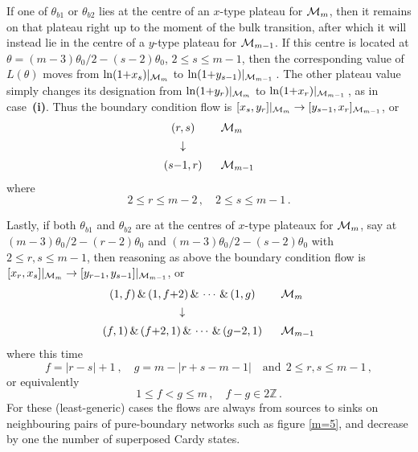 \documentclass[11pt]{article}
\newcommand\ZZ{{\mathbb Z}}
\newcommand{\CM}{{\cal M}}
\newcommand\beq{\begin{equation}}
\newcommand\eeq{\end{equation}}
\newcommand{\tbi}{\theta_{b1}}
\newcommand{\tbii}{\theta_{b2}}
\newcommand{\tz}{\theta_0}
\begin{document}
\smallskip

If one of $\tbi$ or $\tbii$ lies at the centre of an $x$-type plateau
for $\CM_m$, then it remains on that plateau right up to 
the moment of the bulk transition, after which it will instead lie in
the centre of a $y$-type plateau for $\CM_{m-1}$.
If this centre is located at $\theta=(m-3)\tz/2-(s{-}2)\tz$, 
$2\le s\le m{-}1$, then the corresponding
value of $L(\theta)$ moves from $\ln(1{+}x_s)|_{\CM_m}$ to
$\ln(1{+}y_{s-1})|_{\CM_{m-1}}$\,. 
The other plateau value simply changes its designation
from $\ln(1{+}y_r)|_{\CM_m}$ to
$\ln(1{+}x_r)|_{\CM_{m-1}}$\,, as in case~{\bf (i)}. 
Thus the boundary condition flow is
$[x_s,y_r]|_{\CM_m}\to [y_{s-1},x_r]_{\CM_{m-1}}$, or
\beq
\begin{array}{cl}
(r,s) & ~~\CM_m\\[4pt]
\downarrow & \\[5pt]
(s{-}1,r) & ~~\CM_{m-1}
\end{array}
\label{case2}
\eeq
where
\beq
2\le r\le m{-}2\,,\quad
2\le s\le m{-}1\,.
\eeq

\smallskip

Lastly, if both $\tbi$ and $\tbii$ are at the centres of $x$-type
plateaux for $\CM_m$, say at
$(m-3)\tz/2-(r{-}2)\tz$ and
$(m-3)\tz/2-(s{-}2)\tz$ with $2\le r,s\le m{-}1$, 
then reasoning as above the boundary condition flow is
$[x_r,x_s]|_{\CM_m}\to [y_{r-1},y_{s-1}]|_{\CM_{m-1}}$, or
\beq
\begin{array}{cl}
(1,f)\,\&\,(1,f{+}2)\,\&\,\cdots\,\&\,(1,g) & ~~\CM_{m}\\[4pt]
\downarrow & \\[5pt]
(f,1)\,\&\,(f{+}2,1)\,\&\,\cdots\,\&\,(g{-}2,1) & ~~\CM_{m-1}
\end{array}
\eeq
where this time
\beq
f=|r{-}s|{+}1~,\quad g=m{-}|r{+}s{-}m{-}1|
\quad \mbox{and}~~ 2\le r,s \le m{-}1\,,
\eeq
or equivalently
\beq
1\le f<g\le m\,,\quad f-g\in 2\ZZ\,.
\eeq
For these (least-generic) cases the flows are always from sources to 
sinks on neighbouring pairs of pure-boundary
networks such as figure \ref{m=5}, and decrease by 
one the number of superposed Cardy states.


\medskip
\end{document}
